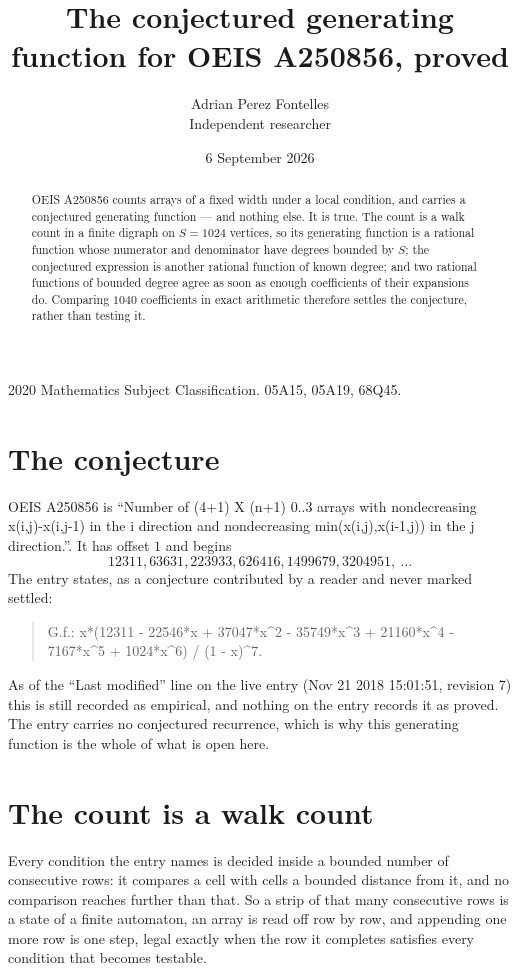 \documentclass[11pt,a4paper]{article}
\title{The conjectured generating function for OEIS A250856, proved}
\author{Adrian Perez Fontelles\\ \small Independent researcher}
\date{6 September 2026}
\theoremstyle{plain}
\theoremstyle{definition}
\begin{document}
\maketitle

\begin{abstract}
OEIS A250856 counts arrays of a fixed width under a local condition, and carries a conjectured
generating function --- and nothing else. It is true. The count is a walk count in a finite
digraph on $S=1024$ vertices, so its generating function is a rational function whose numerator
and denominator have degrees bounded by $S$; the conjectured expression is another rational
function of known degree; and two rational functions of bounded degree agree as soon as enough
coefficients of their expansions do. Comparing $1040$ coefficients in exact arithmetic
therefore settles the conjecture, rather than testing it.
\end{abstract}

\noindent\small 2020 Mathematics Subject Classification. 05A15, 05A19, 68Q45.\normalsize

\section{The conjecture}

OEIS A250856 is ``Number of (4+1) X (n+1) 0..3 arrays with nondecreasing x(i,j)-x(i,j-1) in the i direction and nondecreasing min(x(i,j),x(i-1,j)) in the j direction.''. It has offset $1$ and begins
\[
12311, 63631, 223933, 626416, 1499679, 3204951,\ \dots
\]
The entry states, as a conjecture contributed by a reader and never marked settled:
\begin{quote}
G.f.: x*(12311 - 22546*x + 37047*x\^{}2 - 35749*x\^{}3 + 21160*x\^{}4 - 7167*x\^{}5 + 1024*x\^{}6) / (1 - x)\^{}7.
\end{quote}
As of the ``Last modified'' line on the live entry (Nov 21 2018 15:01:51, revision 7) this is still
recorded as empirical, and nothing on the entry records it as proved. The entry carries no
conjectured recurrence, which is why this generating function is the whole of what is open
here.

\section{The count is a walk count}

Every condition the entry names is decided inside a bounded number of consecutive rows: it
compares a cell with cells a bounded distance from it, and no comparison reaches further than
that. So a strip of that many consecutive rows is a state of a finite automaton, an array is
read off row by row, and appending one more row is one step, legal exactly when the row it
completes satisfies every condition that becomes testable.
\end{document}
